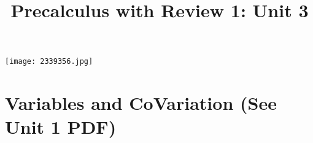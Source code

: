 \documentclass[handout]{xourse}
\title{Precalculus with Review 1: Unit 3}
\begin{document}
\texttt{[image: 2339356.jpg]}
\maketitle


	





\part{Variables and CoVariation (See Unit 1 PDF)}  %
%
%
%
%
%
%
%
%
\end{document}
